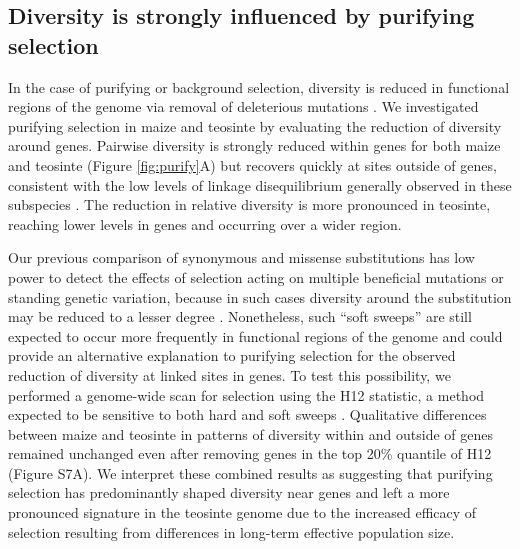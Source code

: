 \documentclass[12pt,a4paper]{article}
\newcommand{\mbh}[1]{\textcolor{blue}{\scriptsize #1}}
\begin{document}
\subsection*{Diversity is strongly influenced by purifying selection} %
In the case of purifying or background selection, diversity is reduced in functional regions of the genome via removal of deleterious mutations \cite{charlesworth1993}.
We investigated purifying selection in maize and teosinte by evaluating the reduction of diversity around genes.
Pairwise diversity is strongly reduced within genes for both maize and teosinte (Figure \ref{fig:purify}A) but recovers quickly at sites outside of genes, consistent with the low levels of linkage disequilibrium generally observed in these subspecies \cite{chia2012}. 
The reduction in relative diversity is more pronounced in teosinte, reaching lower levels in genes and occurring over a wider region.  

Our previous comparison of synonymous and missense substitutions has low power to detect the effects of selection acting on multiple beneficial mutations or standing genetic variation, because in such cases diversity around the substitution may be reduced to a lesser degree \cite{messer2013}. 
Nonetheless, such ``soft sweeps'' are still expected to occur more frequently in functional regions of the genome and could provide an alternative explanation to purifying selection for the observed reduction of diversity at linked sites in genes. 
To test this possibility, we performed a genome-wide scan for selection using the H12 statistic, a method expected to be sensitive to both hard and soft sweeps \cite{garud2015}. 
Qualitative differences between maize and teosinte in patterns of diversity within and outside of genes remained unchanged even after removing genes in the top 20\% quantile of H12 (Figure S7A).
We interpret these combined results as suggesting that purifying selection has predominantly shaped diversity near genes and left a more pronounced signature in the teosinte genome due to the increased efficacy of selection resulting from differences in long-term effective population size.
\end{document}
